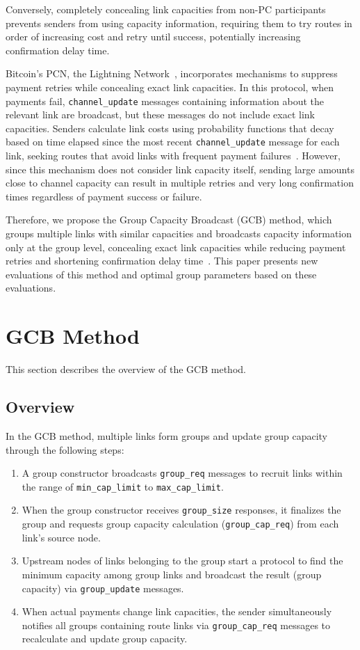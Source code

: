 \documentclass[conference]{IEEEtran}
\newcommand{\groupcapreq}{\texttt{group\_cap\_req}}
\newcommand{\groupupdate}{\texttt{group\_update}}
\newcommand{\groupreq}{\texttt{group\_req}}
\newcommand{\channelupdate}{\texttt{channel\_update}}
\newcommand{\groupsize}{\texttt{group\_size}}
\newcommand{\mincaplimit}{\texttt{min\_cap\_limit}}
\newcommand{\maxcaplimit}{\texttt{max\_cap\_limit}}
\begin{document}
Conversely, completely concealing link capacities from non-PC participants prevents senders from using capacity information, requiring them to try routes in order of increasing cost and retry until success, potentially increasing confirmation delay time.

Bitcoin's PCN, the Lightning Network~\cite{poon_dryja_2016,lnbolt}, incorporates mechanisms to suppress payment retries while concealing exact link capacities. In this protocol, when payments fail, \channelupdate{} messages containing information about the relevant link are broadcast, but these messages do not include exact link capacities. Senders calculate link costs using probability functions that decay based on time elapsed since the most recent \channelupdate{} message for each link, seeking routes that avoid links with frequent payment failures~\cite{lnd,Andreescu_2021}. However, since this mechanism does not consider link capacity itself, sending large amounts close to channel capacity can result in multiple retries and very long confirmation times regardless of payment success or failure.

Therefore, we propose the Group Capacity Broadcast (GCB) method, which groups multiple links with similar capacities and broadcasts capacity information only at the group level, concealing exact link capacities while reducing payment retries and shortening confirmation delay time~\cite{published_papers/48227240}. This paper presents new evaluations of this method and optimal group parameters based on these evaluations.

\section{GCB Method}

This section describes the overview of the GCB method.

\subsection{Overview}

In the GCB method, multiple links form groups and update group capacity through the following steps:
\begin{enumerate}
	\item A group constructor broadcasts \groupreq{} messages to recruit links within the range of \mincaplimit{} to \maxcaplimit{}.
	\item When the group constructor receives \groupsize{} responses, it finalizes the group and requests group capacity calculation (\groupcapreq{}) from each link's source node.
	\item Upstream nodes of links belonging to the group start a protocol to find the minimum capacity among group links and broadcast the result (group capacity) via \groupupdate{} messages.
	\item When actual payments change link capacities, the sender simultaneously notifies all groups containing route links via \groupcapreq{} messages to recalculate and update group capacity.
\end{enumerate}
\end{document}
